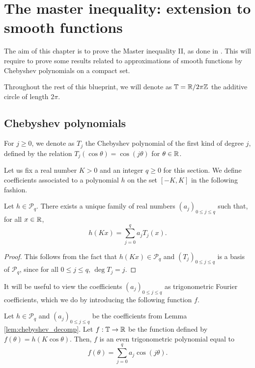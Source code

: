 \chapter{The master inequality: extension to smooth functions}

The aim of this chapter is to prove the Master inequality II, as
done in \cite[Section 7]{chen2025}.
This will require to prove some results related to approximations
of smooth functions by Chebyshev polynomials on a compact set.

Throughout the rest of this blueprint,
we will denote as $\mathbb{T} = \mathbb{R} / 2 \pi\mathbb{Z}$ the additive circle of length $2 \pi$.

\section{Chebyshev polynomials}

For $j \geq 0$, we denote as $T_j$ the Chebyshev polynomial of the first kind of degree $j$,
defined by the relation $T_j(\cos \theta) = \cos(j \theta)$ for $\theta \in \mathbb{R}$.

Let us fix a real number $K > 0$ and an integer $q \geq 0$ for this section.
We define coefficients associated to a polynomial $h$ on the set $[-K,K]$ in the following
fashion.

\begin{lemma}
  \label{lem:chebyshev_decomp}
  Let $h \in \mathcal{P}_q$.
  There exists a unique family of real numbers $(a_j)_{0 \leq j \leq q}$ such that,
  for all $x \in \mathbb{R}$,
  \begin{equation*}
    h(Kx) = \sum_{j=0}^q a_j T_j (x).
  \end{equation*}
\end{lemma}

\begin{proof}
  This follows from the fact that $h(Kx) \in \mathcal{P}_q$ and $(T_j)_{0 \leq j \leq q}$ is a basis of $\mathcal{P}_q$,
  since for all $0 \leq j \leq q$, $\deg T_j = j$.
\end{proof}

It will be useful to view the coefficients $(a_j)_{0 \leq j \leq q}$ as trigonometric
Fourier coefficients, which we do by introducing the following function $f$.

\begin{lemma}
  \label{lem:f_def}
  Let $h \in \mathcal{P}_q$ and $(a_j)_{0 \leq j \leq q}$ be the coefficients from Lemma
  \ref{lem:chebyshev_decomp}.
  Let $f : \mathbb{T} \rightarrow \mathbb{R}$ be the function defined by $f(\theta) = h(K \cos \theta)$.
  Then, $f$ is an even trigonometric polynomial equal to
  \begin{equation*}
    f(\theta)
    =
      \sum_{j=0}^q a_j \cos(j \theta).
 \end{equation*}
\end{lemma}

